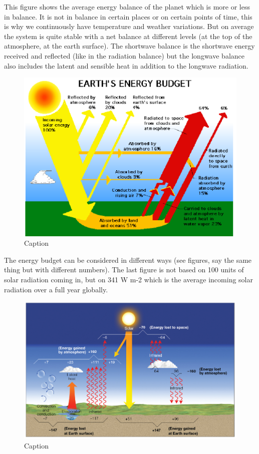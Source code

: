 \documentclass[oneside]{book}
\begin{document}
This figure shows the average energy balance of the planet which is more
or less in balance. It is not in balance in certain places or on certain
points of time, this is why we continuously have temperature and weather
variations. But on average the system is quite stable with a net balance
at different levels (at the top of the atmosphere, at the earth
surface). The shortwave balance is the shortwave energy received and
reflected (like in the radiation balance) but the longwave balance also
includes the latent and sensible heat in addition to the longwave
radiation.

\begin{figure}

{\centering \includegraphics[width=0.5\linewidth]{figures/Figure139} 

}

\caption{Caption}\label{fig:EnergyBudget}
\end{figure}

The energy budget can be considered in different ways (see figures, say
the same thing but with different numbers). The last figure is not based
on 100 units of solar radiation coming in, but on 341 W m-2 which is the
average incoming solar radiation over a full year globally.

\begin{figure}

{\centering \includegraphics[width=0.5\linewidth]{figures/Figure140} 

}

\caption{Caption}\label{fig:EnergyBudget2}
\end{figure}
\end{document}
